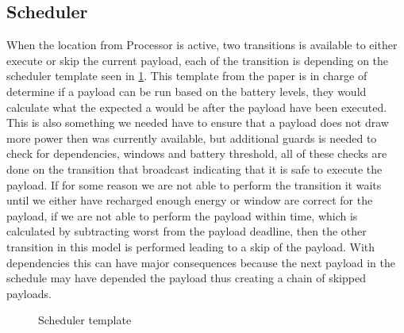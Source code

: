 \subsection{Scheduler}
When the location  from Processor is active, two transitions is available to either execute or skip the current payload, each of the transition is depending on the scheduler template seen in \cref{fig:smc_S}. This template from the paper is in charge of determine if a payload can be run based on the battery levels, they would calculate what the expected a would be after the payload have been executed. This is also something we needed have to ensure that a payload does not draw more power then was currently available, but additional guards is needed to check for dependencies, windows and battery threshold, all of these checks are done on the transition that broadcast  indicating that it is safe to execute the payload. If for some reason we are not able to perform the transition it waits until we either have recharged enough energy or window are correct for the payload, if we are not able to perform the payload within time, which is calculated by subtracting worst from the payload deadline, then the other transition in this model is performed leading to a skip of the payload. With dependencies this can have major consequences because the next payload in the schedule may have depended the payload thus creating a chain of skipped payloads.

\begin{figure}[H]
	\centering
	\caption{Scheduler template}
	\label{fig:smc_S}
\end{figure}

